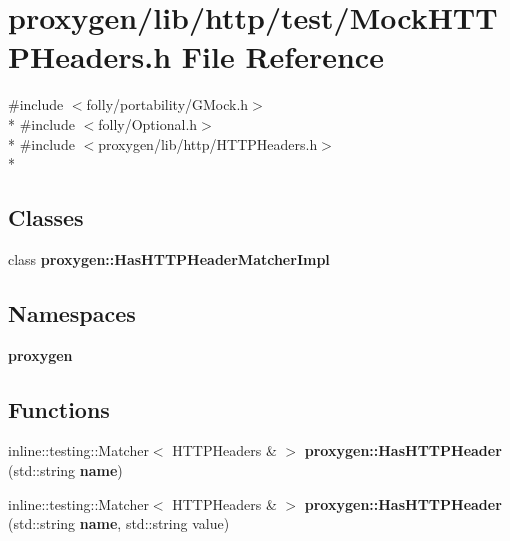 \section{proxygen/lib/http/test/\+Mock\+H\+T\+T\+P\+Headers.h File Reference}
\label{MockHTTPHeaders_8h}
{\ttfamily \#include $<$folly/portability/\+G\+Mock.\+h$>$}\\*
{\ttfamily \#include $<$folly/\+Optional.\+h$>$}\\*
{\ttfamily \#include $<$proxygen/lib/http/\+H\+T\+T\+P\+Headers.\+h$>$}\\*
\subsection*{Classes}
\begin{DoxyCompactItemize}
\item 
class {\bf proxygen\+::\+Has\+H\+T\+T\+P\+Header\+Matcher\+Impl}
\end{DoxyCompactItemize}
\subsection*{Namespaces}
\begin{DoxyCompactItemize}
\item 
 {\bf proxygen}
\end{DoxyCompactItemize}
\subsection*{Functions}
\begin{DoxyCompactItemize}
\item 
inline\+::testing\+::\+Matcher$<$ H\+T\+T\+P\+Headers \& $>$ {\bf proxygen\+::\+Has\+H\+T\+T\+P\+Header} (std\+::string {\bf name})
\item 
inline\+::testing\+::\+Matcher$<$ H\+T\+T\+P\+Headers \& $>$ {\bf proxygen\+::\+Has\+H\+T\+T\+P\+Header} (std\+::string {\bf name}, std\+::string value)
\end{DoxyCompactItemize}
